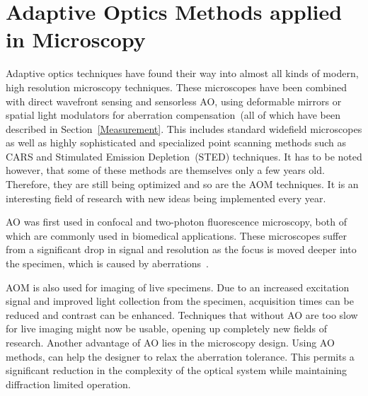 
\section{Adaptive Optics Methods applied in Microscopy}
\label{sec:ExperimentDiscussion}

Adaptive optics techniques have found their way into almost all kinds of modern, high resolution microscopy techniques. These microscopes have been combined with direct wavefront sensing and sensorless AO, using deformable mirrors or spatial light modulators for aberration compensation~(all of which have been described in Section~\ref{Measurement}. This includes standard widefield microscopes as well as highly sophisticated and specialized point scanning methods such as CARS and Stimulated Emission Depletion~(STED) techniques. It has to be noted however, that some of these methods are themselves only a few years old. Therefore, they are still being optimized and so are the AOM techniques. It is an interesting field of research with new ideas being implemented every year.

AO was first used in confocal and two-photon fluorescence microscopy, both of which are commonly used in biomedical applications. These microscopes suffer from a significant drop in signal and resolution as the focus is moved deeper into the specimen, which is caused by aberrations~\cite{characterizing_abberations}.

AOM is also used for imaging of live specimens. Due to an increased excitation signal and improved light collection from the specimen, acquisition times can be reduced and contrast can be enhanced. Techniques that without AO are too slow for live imaging might now be usable, opening up completely new fields of research. Another advantage of AO lies in the microscopy design. Using AO methods, can help the designer to relax the aberration tolerance. This permits a significant reduction in the complexity of the optical system while maintaining diffraction limited operation.

